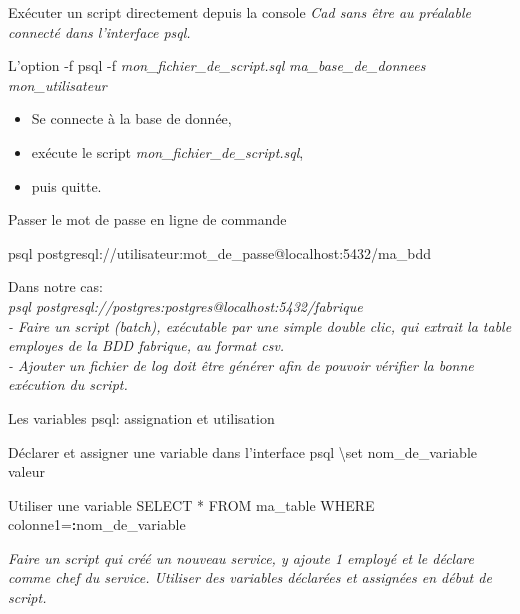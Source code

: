 \documentclass[dvipsnames]{beamer}
\begin{document}
\begin{frame}[t]{Exécuter un script directement depuis la console}
	\textit{{\footnotesize Cad sans être au préalable connecté dans l'interface psql.}}
	\begin{block}{L'option -f}
		psql -f \textit{mon\_fichier\_de\_script.sql} \textit{ma\_base\_de\_donnees} \textit{mon\_utilisateur}\\
		\begin{itemize}
			\item Se connecte à la base de donnée,
			\item exécute le script \textit{mon\_fichier\_de\_script.sql},
			\item puis quitte.
		\end{itemize}
	\end{block}
\end{frame}


\begin{frame}{Passer le mot de passe en ligne de commande}
	\begin{block}{}
		{\small psql postgresql://utilisateur:mot\_de\_passe@localhost:5432/ma\_bdd}
	\end{block}
	
	Dans notre cas:\\ \textit{psql postgresql://postgres:postgres@localhost:5432/fabrique}\\

	\vspace{1em}
	\textit{- Faire un script (batch), exécutable par une simple double clic, qui extrait la table employes de la BDD fabrique, au format csv.}\\
	\textit{- Ajouter un fichier de log doit être générer afin de pouvoir vérifier la bonne exécution du script.}
	

\end{frame}


\begin{frame}{Les variables psql: assignation et utilisation}
	\begin{block}{Déclarer et assigner une variable dans l'interface psql}
		\textbackslash set nom\_de\_variable valeur
	\end{block}

	\begin{block}{Utiliser une variable}
		SELECT * FROM ma\_table WHERE colonne1=\textbf{:}nom\_de\_variable
	\end{block}
	
	\textit{Faire un script qui créé un nouveau service, y ajoute 1 employé et le déclare comme chef du service. Utiliser des variables déclarées et assignées en début de script.}
	
\end{frame}
\end{document}
